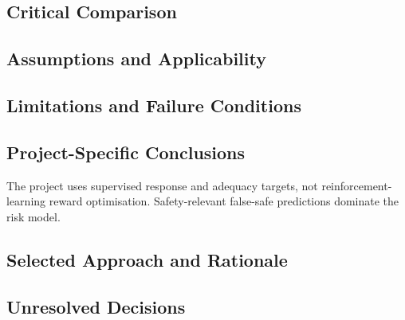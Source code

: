 \subsection{Critical Comparison}
\label{sec:res-ml-obj-critical-comparison}


\subsection{Assumptions and Applicability}
\label{sec:res-ml-obj-assumptions}


\subsection{Limitations and Failure Conditions}
\label{sec:res-ml-obj-limitations}


\subsection{Project-Specific Conclusions}
\label{sec:res-ml-obj-conclusions}

The project uses supervised response and adequacy targets, not
reinforcement-learning reward optimisation. Safety-relevant false-safe
predictions dominate the risk model.

\subsection{Selected Approach and Rationale}
\label{sec:res-ml-obj-selected-approach}


\subsection{Unresolved Decisions}
\label{sec:res-ml-obj-unresolved-decisions}


